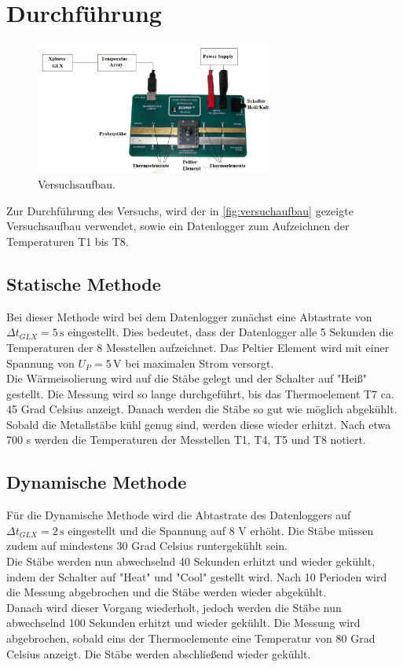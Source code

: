 \section{Durchführung}
\label{sec:Durchfuehrung}
\begin{figure}
    \centering
    \includegraphics[width=0.7\textwidth]{Versuchaufbau.png}
    \caption{Versuchsaufbau.}
    \label{fig:versuchaufbau}
  \end{figure}

Zur Durchführung des Versuchs, wird der in \autoref{fig:versuchaufbau} gezeigte Versuchsaufbau verwendet, sowie ein Datenlogger zum Aufzeichnen der Temperaturen
T1 bis T8.

\subsection{Statische Methode}
\label{sec:StatischeMethode}

Bei dieser Methode wird bei dem Datenlogger zunächst eine Abtastrate von $\Delta t_{GLX} = 5 \mathrm{\, s}$ eingestellt. Dies bedeutet, dass der Datenlogger alle
5 Sekunden die Temperaturen der 8 Messtellen aufzeichnet. Das Peltier Element wird mit einer Spannung von $U_P = 5 \mathrm{\, V}$ bei maximalen Strom versorgt. \\
Die Wärmeisolierung wird auf die Stäbe gelegt und der Schalter auf "Heiß" gestellt. Die Messung wird so lange durchgeführt, bis das Thermoelement T7 ca. 45 Grad 
Celsius anzeigt. Danach werden die Stäbe so gut wie möglich abgekühlt.\\
Sobald die Metallstäbe kühl genug sind, werden diese wieder erhitzt. Nach etwa 700 s werden die Temperaturen der Messtellen T1, T4, T5 und T8 notiert.

\subsection{Dynamische Methode}
\label{sec:DynamischeMethode} 

Für die Dynamische Methode wird die Abtastrate des Datenloggers auf $\Delta t_{GLX} = 2 \mathrm{\, s}$ eingestellt und die Spannung auf 8 V erhöht. Die Stäbe 
müssen zudem auf mindestens 30 Grad Celsius runtergekühlt sein.\\
Die Stäbe werden nun abwechselnd 40 Sekunden erhitzt und wieder gekühlt, indem der Schalter auf "Heat" und "Cool" gestellt wird. Nach 10 Perioden wird die Messung
abgebrochen und die Stäbe werden wieder abgekühlt.\\
Danach wird dieser Vorgang wiederholt, jedoch werden die Stäbe nun abwechselnd 100 Sekunden erhitzt und wieder gekühlt. Die Messung wird abgebrochen, sobald eins der
Thermoelemente eine Temperatur von 80 Grad Celsius anzeigt. Die Stäbe werden abschließend wieder gekühlt.
\newpage